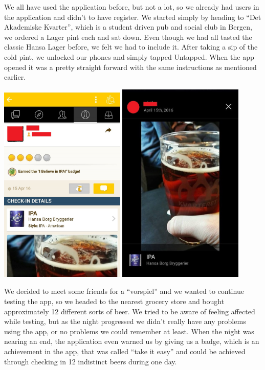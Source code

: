 \documentclass[12pt]{article}
\begin{document}
We all have used the application before, but not a lot, so we already had users in the
application and didn’t to have register. We started simply by heading to “Det
Akademiske Kvarter”, which is a student driven pub and social club in Bergen, we
ordered a Lager pint each and sat down. Even though we had all tasted the
classic Hansa Lager before, we felt we had to include it. After taking a sip of
the cold pint, we unlocked our phones and simply tapped Untapped. When the app
opened it was a pretty straight forward with the same instructions as mentioned
earlier.

\includegraphics[width=6cm]{pictures/app/sensur1}
\includegraphics[width=6cm]{pictures/app/sensur2}


We decided to meet some friends for a “vorspiel” and we wanted to continue
testing the app, so we headed to the nearest grocery store and bought
approximately 12 different sorts of beer. We tried to be aware of feeling
affected while testing, but as the night progressed we didn’t really have any
problems using the app, or no problems we could remember at least. When the
night was nearing an end, the application even warned us by giving us a badge,
which is an achievement in the app, that was called “take it easy” and could be
achieved through checking in 12 indistinct beers during one day.
\end{document}
